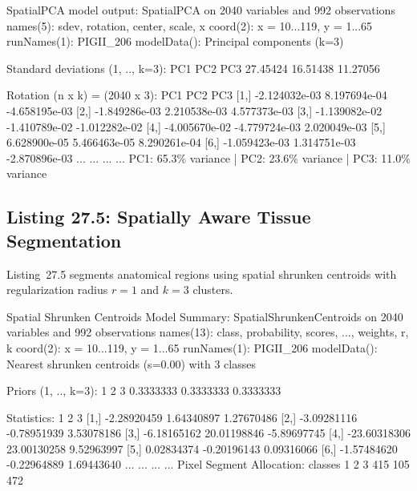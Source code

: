 \documentclass[11pt,twoside,openright]{book}
\begin{document}
\begin{routput}
SpatialPCA model output:
SpatialPCA on 2040 variables and 992 observations
names(5): sdev, rotation, center, scale, x
coord(2): x = 10...119, y = 1...65
runNames(1): PIGII\_206
modelData(): Principal components (k=3)

Standard deviations (1, .., k=3):
      PC1      PC2      PC3
 27.45424 16.51438 11.27056

Rotation (n x k) = (2040 x 3):
               PC1           PC2           PC3
[1,] -2.124032e-03  8.197694e-04 -4.658195e-03
[2,] -1.849286e-03  2.210538e-03  4.577373e-03
[3,] -1.139082e-02 -1.410789e-02 -1.012282e-02
[4,] -4.005670e-02 -4.779724e-03  2.020049e-03
[5,]  6.628900e-05  5.466463e-05  8.290261e-04
[6,] -1.059423e-03  1.314751e-03 -2.870896e-03
...            ...           ...           ...
PC1: 65.3\% variance | PC2: 23.6\% variance | PC3: 11.0\% variance
\end{routput}

\subsection{Listing 27.5: Spatially Aware Tissue Segmentation}

Listing~27.5 segments anatomical regions using spatial shrunken centroids with regularization radius $r = 1$ and $k = 3$ clusters.


\begin{routput}
Spatial Shrunken Centroids Model Summary:
SpatialShrunkenCentroids on 2040 variables and 992 observations
names(13): class, probability, scores, ..., weights, r, k
coord(2): x = 10...119, y = 1...65
runNames(1): PIGII\_206
modelData(): Nearest shrunken centroids (s=0.00) with 3 classes

Priors (1, .., k=3):
         1         2         3
 0.3333333 0.3333333 0.3333333

Statistics:
                1            2            3
[1,]  -2.28920459   1.64340897   1.27670486
[2,]  -3.09281116  -0.78951939   3.53078186
[3,]  -6.18165162  20.01198846  -5.89697745
[4,] -23.60318306  23.00130258   9.52963997
[5,]   0.02834374  -0.20196143   0.09316066
[6,]  -1.57484620  -0.22964889   1.69443640
...           ...          ...          ...
Pixel Segment Allocation:
classes
  1   2   3 
415 105 472 
\end{routput}
\end{document}
